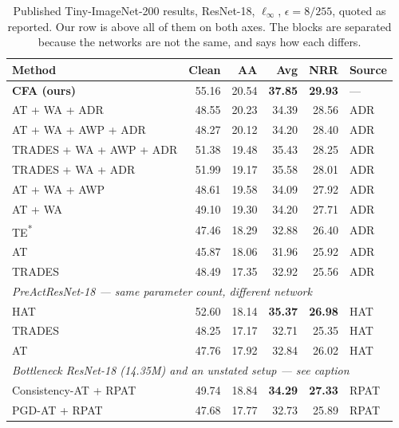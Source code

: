 \begin{table}[!htbp]
  \centering \small \setlength{\tabcolsep}{4.5pt}
  \caption{Published Tiny-ImageNet-200 results, ResNet-18, $\ell_\infty$, $\epsilon = 8/255$, quoted as
  reported. Our row is above all of them on both axes. The blocks are separated because the networks
  are not the same, and  says how each differs.}
  \label{tab:published_tin}
  \begin{tabular}{lrrrrl}
    \toprule
    Method & Clean & AA & Avg & NRR & Source \\
    \midrule
    \textbf{CFA (ours)}        & 55.16 & 20.54 & \textbf{37.85} & \textbf{29.93} & --- \\
    \midrule
    AT + WA + ADR              & 48.55 & 20.23 & 34.39 & 28.56 & ADR \\
    AT + WA + AWP + ADR        & 48.27 & 20.12 & 34.20 & 28.40 & ADR \\
    TRADES + WA + AWP + ADR    & 51.38 & 19.48 & 35.43 & 28.25 & ADR \\
    TRADES + WA + ADR          & 51.99 & 19.17 & 35.58 & 28.01 & ADR \\
    AT + WA + AWP              & 48.61 & 19.58 & 34.09 & 27.92 & ADR \\
    AT + WA                    & 49.10 & 19.30 & 34.20 & 27.71 & ADR \\
    TE\textsuperscript{*}      & 47.46 & 18.29 & 32.88 & 26.40 & ADR \\
    AT                         & 45.87 & 18.06 & 31.96 & 25.92 & ADR \\
    TRADES                     & 48.49 & 17.35 & 32.92 & 25.56 & ADR \\
    \midrule
    \multicolumn{6}{l}{\emph{PreActResNet-18 --- same parameter count, different network}} \\
    HAT                        & 52.60 & 18.14 & \textbf{35.37} & \textbf{26.98} & HAT \\
    TRADES                     & 48.25 & 17.17 & 32.71 & 25.35 & HAT \\
    AT                         & 47.76 & 17.92 & 32.84 & 26.02 & HAT \\
    \midrule
    \multicolumn{6}{l}{\emph{Bottleneck ResNet-18 (14.35M) and an unstated setup --- see caption}} \\
    Consistency-AT + RPAT      & 49.74 & 18.84 & \textbf{34.29} & \textbf{27.33} & RPAT \\
    PGD-AT + RPAT              & 47.68 & 17.77 & 32.73 & 25.89 & RPAT \\

\end{tabular}
\end{table}
